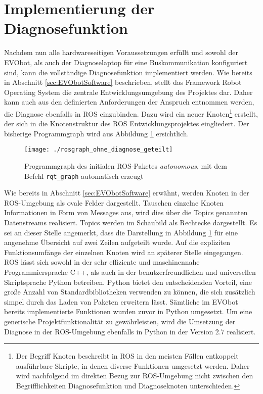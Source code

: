 \section{Implementierung der Diagnosefunktion} \label{sec:ImplementierungDiagnose} %

Nachdem nun alle hardwareseitigen Voraussetzungen erfüllt und sowohl der EVObot, als auch der Diagnoselaptop für eine Buskommunikation konfiguriert sind, kann die vollständige Diagnosefunktion implementiert werden. Wie bereits in Abschnitt \ref{sec:EVObotSoftware} beschrieben, stellt das Framework Robot Operating System die zentrale Entwicklungsumgebung des Projektes dar. Daher kann auch aus den definierten Anforderungen der Anspruch entnommen werden, die Diagnose ebenfalls in ROS einzubinden. Dazu wird ein neuer Knoten\footnote{Der Begriff Knoten beschreibt in ROS in den meisten Fällen entkoppelt ausführbare Skripte, in denen diverse Funktionen umgesetzt werden. Daher wird nachfolgend im direkten Bezug zur ROS-Umgebung nicht zwischen den Begrifflichkeiten Diagnosefunktion und Diagnoseknoten unterschieden.} erstellt, der sich in die Knotenstruktur des ROS Entwicklungsprojektes eingliedert. Der bisherige Programmgraph wird aus Abbildung \ref{abb:rosgraphOhneDiagnose} ersichtlich.

\begin{figure}[!htbp]
	\centering
	\texttt{[image: ./rosgraph\_ohne\_diagnose\_geteilt]}
	\caption{Programmgraph des initialen ROS-Paketes \emph{autonomous}, mit dem Befehl \texttt{rqt\_graph} automatisch erzeugt}
	\label{abb:rosgraphOhneDiagnose}
\end{figure} 

Wie bereits in Abschnitt \ref{sec:EVObotSoftware} erwähnt, werden Knoten in der ROS-Umgebung als ovale Felder dargestellt. Tauschen einzelne Knoten Informationen in Form von Messages aus, wird dies über die Topics genannten Datenstreams realisiert. Topics werden im Schaubild als Rechtecke dargestellt. Es sei an dieser Stelle angemerkt, dass die Darstellung in Abbildung \ref{abb:rosgraphOhneDiagnose} für eine angenehme Übersicht auf zwei Zeilen aufgeteilt wurde. Auf die expliziten Funktionsumfänge der einzelnen Knoten wird an späterer Stelle eingegangen.\\
ROS lässt sich sowohl in der sehr effiziente und maschinennahe Programmiersprache C++, als auch in der benutzerfreundlichen und universellen Skriptsprache Python betreiben. Python bietet den entscheidenden Vorteil, eine große Anzahl von Standardbibliotheken verwenden zu können, die sich zusätzlich simpel durch das Laden von Paketen erweitern lässt. Sämtliche im EVObot bereits implementierte Funktionen wurden zuvor in Python umgesetzt. Um eine generische Projektfunktionalität zu gewährleisten, wird die Umsetzung der Diagnose in der ROS-Umgebung ebenfalls in Python in der Version 2.7 realisiert.


